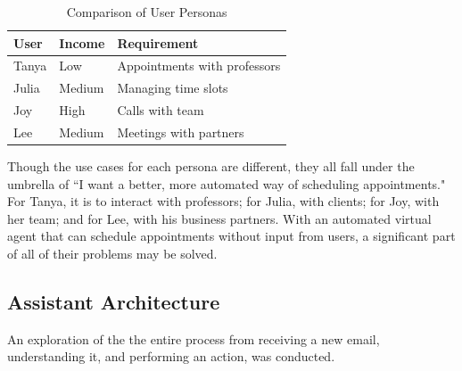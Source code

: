 \documentclass{article}
\begin{document}
\begin{table}[!htb]
	\begin{minipage}{1\linewidth}
		\caption{Comparison of User Personas}
		\centering
		\begin{tabular}{lll}
			\hline
			\textbf{User} & \textbf{Income} & \textbf{Requirement}         \\
			\hline
			Tanya         & Low             & Appointments with professors \\
			Julia         & Medium          & Managing time slots          \\
			Joy           & High            & Calls with team              \\
			Lee           & Medium          & Meetings with partners       \\
			\hline
		\end{tabular}
	\end{minipage}%
\end{table}

Though the use cases for each persona are different, they all fall under the umbrella of ``I want a better, more automated way of scheduling appointments." For Tanya, it is to interact with professors; for Julia, with clients; for Joy, with her team; and for Lee, with his business partners. With an automated virtual agent that can schedule appointments without input from users, a significant part of all of their problems may be solved.

\subsection{Assistant Architecture}

An exploration of the the entire process from receiving a new email, understanding it, and performing an action, was conducted.
\end{document}
